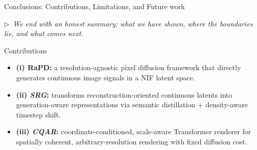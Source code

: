 \documentclass[aspectratio=169,10pt]{beamer}
\newcommand{\rapd}{\textbf{RaPD}}
\newcommand{\srg}{\emph{SRG}}
\newcommand{\cqar}{\emph{CQAR}}
\newcommand{\story}[1]{%
  {\color{rapdgray}\itshape\footnotesize $\triangleright$~#1\par}\vspace{0.3em}}
\begin{document}
\begin{frame}{Conclusions: Contributions, Limitations, and Future work}
  \story{We end with an honest summary: what we have shown, where the boundaries lie, and what comes next.}

  \begin{block}{Contributions}
    \scriptsize
    \begin{itemize}[label=$\bullet$,leftmargin=1.4em,topsep=0pt,itemsep=2pt,parsep=0pt]
      \item \textbf{(i) \rapd:} a resolution-agnostic pixel diffusion framework that directly generates continuous image signals in a NIF latent space.
      \item \textbf{(ii) \srg:} transforms reconstruction-oriented continuous latents into generation-aware representations via semantic distillation + density-aware timestep shift.
      \item \textbf{(iii) \cqar:} coordinate-conditioned, scale-aware Transformer renderer for spatially coherent, arbitrary-resolution rendering with fixed diffusion cost.
    \end{itemize}
  \end{block}
  \vspace{0.2em}


\end{frame}
\end{document}
